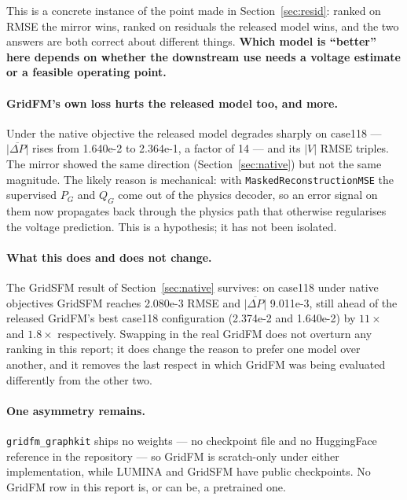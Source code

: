 \documentclass[10pt]{article}
\begin{document}
This is a concrete instance of the point made in Section~\ref{sec:resid}:
ranked on RMSE the mirror wins, ranked on residuals the released model wins, and
the two answers are both correct about different things. \textbf{Which model is
``better'' here depends on whether the downstream use needs a voltage estimate
or a feasible operating point.}

\paragraph{GridFM's own loss hurts the released model too, and more.} Under the
native objective the released model degrades sharply on case118 ---
\(\overline{|\Delta P|}\) rises from 1.640e-2 to 2.364e-1, a factor of 14 --- and
its \(|V|\) RMSE triples. The mirror showed the same direction
(Section~\ref{sec:native}) but not the same magnitude. The likely reason is
mechanical: with \texttt{MaskedReconstructionMSE} the supervised \(P_G\) and
\(Q_G\) come out of the physics decoder, so an error signal on them now
propagates back through the physics path that otherwise regularises the voltage
prediction. This is a hypothesis; it has not been isolated.

\paragraph{What this does and does not change.} The GridSFM result of
Section~\ref{sec:native} survives: on case118 under native objectives GridSFM
reaches 2.080e-3 RMSE and \(\overline{|\Delta P|}\) 9.011e-3, still ahead of the
released GridFM's best case118 configuration (2.374e-2 and 1.640e-2) by
\(11\times\) and \(1.8\times\) respectively. Swapping in the real GridFM does
not overturn any ranking in this report; it does change the reason to prefer
one model over another, and it removes the last respect in which GridFM was
being evaluated differently from the other two.

\paragraph{One asymmetry remains.} \texttt{gridfm\_graphkit} ships no weights
--- no checkpoint file and no HuggingFace reference in the repository --- so
GridFM is scratch-only under either implementation, while LUMINA and GridSFM
have public checkpoints. No GridFM row in this report is, or can be, a
pretrained one.
\end{document}
